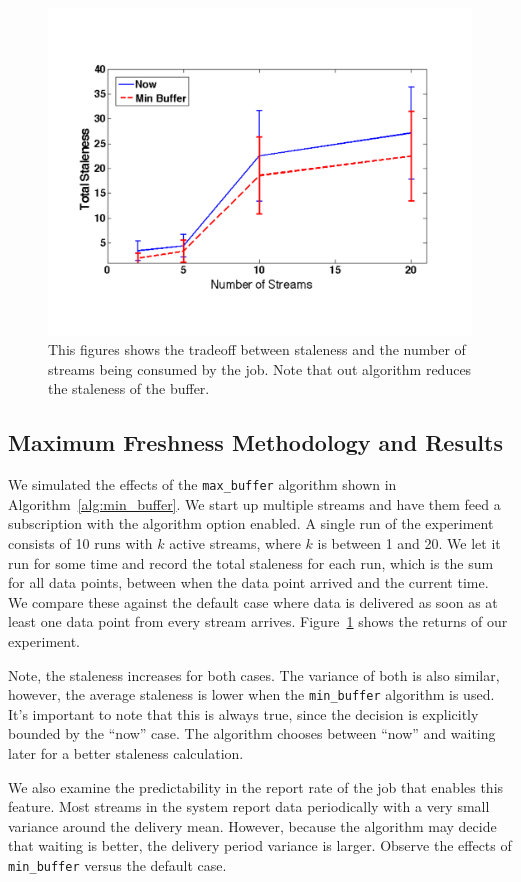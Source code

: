 \begin{figure}[h!] %
\centering
\includegraphics[width=0.75\columnwidth]{figs/staleness_vs_numstreams}
\caption{This figures shows the tradeoff between staleness and the number of streams being consumed by the job.  Note 
that out algorithm reduces the staleness of the buffer.}
\label{fig:stalevsstreams}
\end{figure}

\subsection{Maximum Freshness Methodology and Results}

We simulated the effects of the \texttt{max\_buffer} algorithm shown in Algorithm~\ref{alg:min_buffer}.  We start up multiple streams and
have them feed a subscription with the algorithm option enabled.  A single run of the experiment consists of 10 runs with $k$ active streams,
where $k$ is between 1 and 20.  We let it run for some time and record the total staleness for each run, which is the sum for all data points, between
when the data point arrived and the current time.  We compare these against the default case where data is delivered as soon as at least one data point from every stream arrives.  Figure~\ref{fig:stalevsstreams} shows the returns of our experiment.

Note, the staleness increases for both cases.  The variance of both is also similar, however, the average staleness is lower 
when the \texttt{min\_buffer} algorithm is used.  It's important to note that this is always true, since the decision is explicitly
bounded by the ``now'' case.  The algorithm chooses between ``now'' and waiting later for a better staleness calculation.

We also examine the predictability in the report rate of the job that enables this feature.  Most streams in the system report data periodically
with a very small variance around the delivery mean.  However, because the algorithm may decide that waiting is better, the delivery
period variance is larger.  Observe the effects of \texttt{min\_buffer} versus the default case.


